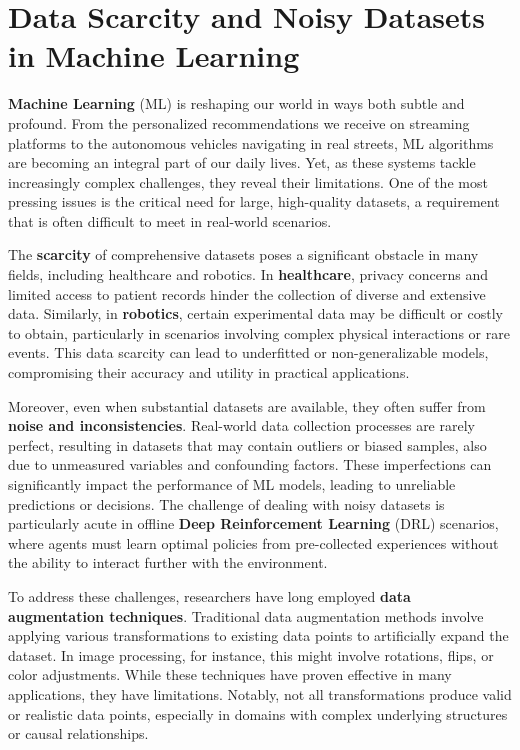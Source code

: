 \section{Data Scarcity and Noisy Datasets in Machine Learning}

\textbf{Machine Learning} (ML) is reshaping our world in ways both
subtle and profound. From the personalized recommendations we receive
on streaming platforms to the autonomous vehicles navigating in real streets,
ML algorithms are becoming an integral part of our daily lives.
Yet, as these systems tackle increasingly complex challenges,
they reveal their limitations.
One of the most pressing issues is the critical need for large, 
high-quality datasets, a requirement that is often difficult to
meet in real-world scenarios.

The \textbf{scarcity} of comprehensive datasets poses a significant
obstacle in many fields, including healthcare and robotics.
In \textbf{healthcare}, privacy concerns and limited access to patient
records hinder the collection of diverse and extensive data.
Similarly, in \textbf{robotics}, certain experimental data may be difficult
or costly to obtain, particularly in scenarios involving complex
physical interactions or rare events. This data scarcity can lead
to underfitted or non-generalizable models, compromising their
accuracy and utility in practical applications.

Moreover, even when substantial datasets are available, they
often suffer from \textbf{noise and inconsistencies}. Real-world data
collection processes are rarely perfect, resulting in datasets
that may contain outliers or biased samples, also due to unmeasured
variables and confounding factors.
These imperfections can significantly impact the performance of ML models,
leading to unreliable predictions or decisions. The challenge of dealing
with noisy datasets is particularly acute in offline
\textbf{Deep Reinforcement Learning} (DRL) scenarios, where agents must learn
optimal policies from pre-collected experiences without the ability
to interact further with the environment.

To address these challenges, researchers have long employed
\textbf{data augmentation techniques}. Traditional data augmentation
methods involve
applying various transformations to existing data points to artificially
expand the dataset. In image processing, for instance, this might involve
rotations, flips, or color adjustments. While these techniques have proven
effective in many applications, they have limitations.
Notably, not all transformations produce valid or realistic data points,
especially in domains with complex underlying structures or causal relationships.

